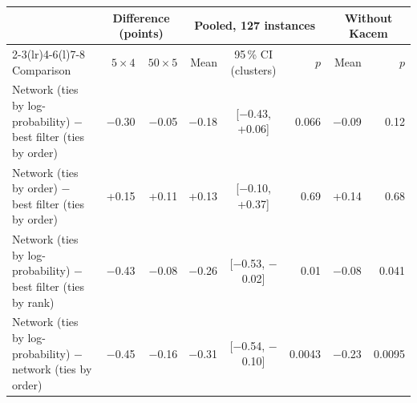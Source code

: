 \begin{tabular}{@{}lrrrcrrr@{}}
\toprule
 & \multicolumn{2}{c}{Difference (points)} & \multicolumn{3}{c}{Pooled, 127 instances} & \multicolumn{2}{c}{Without Kacem} \\
\cmidrule(lr){2-3}\cmidrule(lr){4-6}\cmidrule(l){7-8}
Comparison & $5 \times 4$ & $50 \times 5$ & Mean & 95\,\% CI (clusters) & $p$ & Mean & $p$ \\
\midrule
Network (ties by log-probability) $-$ best filter (ties by order) & $-$0.30 & $-$0.05 & $-$0.18 & [$-$0.43, +0.06] & 0.066 & $-$0.09 & 0.12 \\
Network (ties by order) $-$ best filter (ties by order) & +0.15 & +0.11 & +0.13 & [$-$0.10, +0.37] & 0.69 & +0.14 & 0.68 \\
Network (ties by log-probability) $-$ best filter (ties by rank) & $-$0.43 & $-$0.08 & $-$0.26 & [$-$0.53, $-$0.02] & 0.01 & $-$0.08 & 0.041 \\
Network (ties by log-probability) $-$ network (ties by order) & $-$0.45 & $-$0.16 & $-$0.31 & [$-$0.54, $-$0.10] & 0.0043 & $-$0.23 & 0.0095 \\
\bottomrule
\end{tabular}

